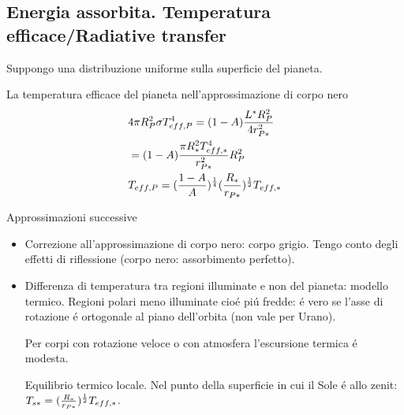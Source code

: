 \subsection{Energia assorbita. Temperatura efficace/Radiative transfer}

Suppongo una distribuzione uniforme sulla superficie del pianeta.

La temperatura efficace del pianeta nell'approssimazione di corpo nero
\begin{align*}
&4\pi R_P^2\sigma T_{eff,P}^4=(1-A)\frac{L^*R_P^2}{4r_{P*}^2}\\
&=(1-A)\frac{\pi R_*^2T_{eff,*}^4}{r_{P*}^2}R_P^2\\
&T_{eff,P}=(\frac{1-A}{A})^{\frac{1}{4}}(\frac{R_*}{r_{P*}})^{\frac{1}{2}}T_{eff,*}
\end{align*}

Approssimazioni successive
\begin{itemize}
    \item Correzione all'approssimazione di corpo nero: corpo grigio. Tengo conto degli effetti di riflessione (corpo nero: assorbimento perfetto).
    \item Differenza di temperatura tra regioni illuminate e non del pianeta: modello termico. Regioni polari meno illuminate cio\'e pi\'u fredde: \'e vero se l'asse di rotazione \'e ortogonale al piano dell'orbita (non vale per Urano).
    
    Per corpi con rotazione veloce o con atmosfera l'escursione termica \'e modesta.
    
    Equilibrio termico locale. Nel punto della superficie in cui il Sole \'e allo zenit: $T_{s*}=(\frac{R_*}{r_{P*}})^{\frac{1}{2}}T_{eff,*}$.
\end{itemize}
                